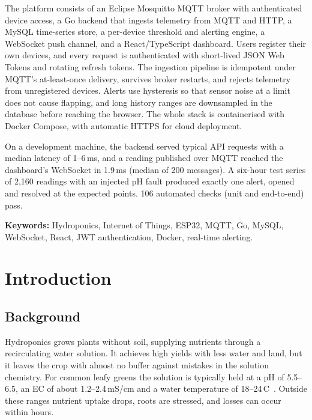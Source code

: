 \documentclass[11pt,a4paper,oneside]{report}
\newcommand{\degC}{\,\textdegree C}
\begin{document}
The platform consists of an Eclipse Mosquitto MQTT broker with authenticated device
access, a Go backend that ingests telemetry from MQTT and HTTP, a MySQL time-series
store, a per-device threshold and alerting engine, a WebSocket push channel, and a
React/TypeScript dashboard. Users register their own devices, and every request is
authenticated with short-lived JSON Web Tokens and rotating refresh tokens. The
ingestion pipeline is idempotent under MQTT's at-least-once delivery, survives broker
restarts, and rejects telemetry from unregistered devices. Alerts use hysteresis so that
sensor noise at a limit does not cause flapping, and long history ranges are downsampled
in the database before reaching the browser. The whole stack is containerised with
Docker Compose, with automatic HTTPS for cloud deployment.

On a development machine, the backend served typical API requests with a median
latency of 1--6\,ms, and a reading published over MQTT reached the dashboard's
WebSocket in 1.9\,ms (median of 200 messages). A six-hour test series of 2,160 readings
with an injected pH fault produced exactly one alert, opened and resolved at the
expected points. 106 automated checks (unit and end-to-end) pass.

\vspace{4pt}
\noindent\textbf{Keywords:} Hydroponics, Internet of Things, ESP32, MQTT, Go, MySQL,
WebSocket, React, JWT authentication, Docker, real-time alerting.
\clearpage

\tableofcontents
\clearpage
\listoffigures
\vspace{0.6cm}
\listoftables
\clearpage


\chapter{Introduction}

\section{Background}
Hydroponics grows plants without soil, supplying nutrients through a recirculating
water solution. It achieves high yields with less water and land, but it leaves the crop
with almost no buffer against mistakes in the solution chemistry. For common leafy
greens the solution is typically held at a pH of 5.5--6.5, an EC of about
1.2--2.4\,mS/cm and a water temperature of 18--24\degC~\cite{resh}. Outside these
ranges nutrient uptake drops, roots are stressed, and losses can occur within hours.
\end{document}

